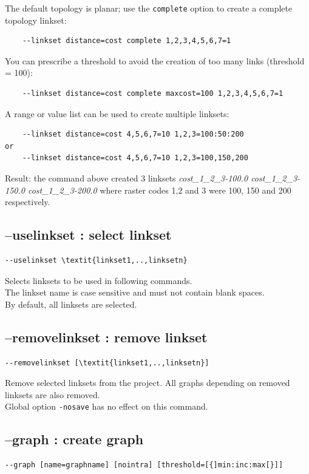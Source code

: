 \documentclass[a4paper,10pt]{report}
\begin{document}
The default topology is planar; use the \verb|complete| option to create a complete topology linkset:
\begin{Verbatim}
	--linkset distance=cost complete 1,2,3,4,5,6,7=1
\end{Verbatim}

You can prescribe a threshold to avoid the creation of too many links (threshold = 100):
\begin{Verbatim}
	--linkset distance=cost complete maxcost=100 1,2,3,4,5,6,7=1
\end{Verbatim}

A range or value list can be used to create multiple linksets:
\begin{Verbatim}
	--linkset distance=cost 4,5,6,7=10 1,2,3=100:50:200
or
	--linkset distance=cost 4,5,6,7=10 1,2,3=100,150,200
\end{Verbatim}
Result: the command above created 3 linksets \textit{cost\_1\_2\_3-100.0 cost\_1\_2\_3-150.0 cost\_1\_2\_3-200.0}
where raster codes 1,2 and 3 were 100, 150 and 200 respectively.


\subsection{--uselinkset : select linkset}
\label{uselinkset}
\begin{Verbatim}[commandchars=\\\{\}]
--uselinkset \textit{linkset1,..,linksetn}
\end{Verbatim}
Selects linksets to be used in following commands.\\
The linkset name is case sensitive and must not contain blank spaces.\\
By default, all linksets are selected.

\subsection{--removelinkset : remove linkset}
\begin{Verbatim}[commandchars=\\\{\}]
--removelinkset [\textit{linkset1,..,linksetn}]
\end{Verbatim}
Remove selected linksets from the project. All graphs depending on removed linksets are also removed.\\
Global option \verb|-nosave| has no effect on this command.


\subsection{--graph : create graph}
\begin{Verbatim}
--graph [name=graphname] [nointra] [threshold=[{]min:inc:max[}]]
\end{Verbatim}
\end{document}
